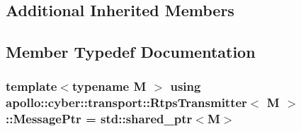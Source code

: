 \subsection*{Additional Inherited Members}


\subsection{Member Typedef Documentation}
\hypertarget{classapollo_1_1cyber_1_1transport_1_1RtpsTransmitter_a28d14859d872c87fc358036e87487663}{
\subsubsection[{Message\-Ptr}]{\setlength{\rightskip}{0pt plus 5cm}template$<$typename M $>$ using {\bf apollo\-::cyber\-::transport\-::\-Rtps\-Transmitter}$<$ M $>$\-::{\bf Message\-Ptr} =  std\-::shared\-\_\-ptr$<$M$>$}}\label{classapollo_1_1cyber_1_1transport_1_1RtpsTransmitter_a28d14859d872c87fc358036e87487663}


